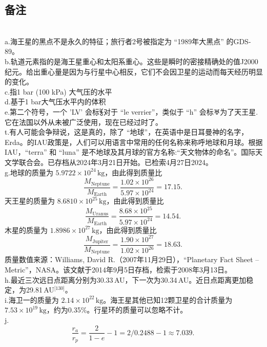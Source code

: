 \subsection{备注}\\
a.海王星的黑点不是永久的特征；旅行者2号被指定为 “1989年大黑点” 的GDS-89。\\
b.轨道元素指的是海王星重心和太阳系重心。这些是瞬时的密接精确处的值J2000纪元。给出重心量是因为与行星中心相反，它们不会因卫星的运动而每天经历明显的变化。\\
c.指1 bar (100 kPa) 大气压的水平\\
d.基于1 bar大气压水平内的体积\\
e.第二个符号，一个 'LV' 会标⯉对于 “le verrier”，类似于 “h” 会标♅为了天王星.它在法国以外从未被广泛使用，现在已经过时了。\\
t.有人可能会争辩说，这是真的，除了 “地球”，在英语中是日耳曼神的名字，Erda。的IAU政策是，人们可以用语言中常用的任何名称来称呼地球和月球。根据IAU，“terra” 和 “luna” 是不地球及其月球的官方名称:“天文物体的命名”。国际天文学联合会。已存档从2024年3月21日开始。已检索4月27日2024。\\
g.地球的质量为 \(5.9722\times10^{24}\,\text{kg}\)，由此得到质量比
\[
\frac{M_{\text{Neptune}}}{M_{\text{Earth}}}
=
\frac{1.02\times10^{26}}{5.97\times10^{24}}
=
17.15.~
\]
天王星的质量为 \(8.6810\times10^{25}\,\text{kg}\)，由此得到质量比
\[
\frac{M_{\text{Uranus}}}{M_{\text{Earth}}}
=
\frac{8.68\times10^{25}}{5.97\times10^{24}}
=
14.54.~
\]
木星的质量为 \(1.8986\times10^{27}\,\text{kg}\)，由此得到质量比
\[
\frac{M_{\text{Jupiter}}}{M_{\text{Neptune}}}
=
\frac{1.90\times10^{27}}{1.02\times10^{26}}
=
18.63.~
\]
质量数值来源：Williams, David R.（2007年11月29日），“Planetary Fact Sheet – Metric”，NASA。该文献于2014年9月5日存档，检索于2008年3月13日。\\
h.最近三次远日点距离分别为30.33\,AU，下一次为30.34\,AU。近日点距离更加稳定，为29.81\,AU\(^\text{[130]}\)。\\
i.海卫一的质量为 \(2.14\times10^{22}\,\text{kg}\)。海王星其他已知12颗卫星的合计质量为 \(7.53\times10^{19}\,\text{kg}\)，约为0.35\%。行星环的质量可以忽略不计。\\
j.\[
\frac{r_{a}}{r_{p}}
=
\frac{2}{1-e}-1
=
2/0.2488 - 1
\approx 7.039.~
\]
